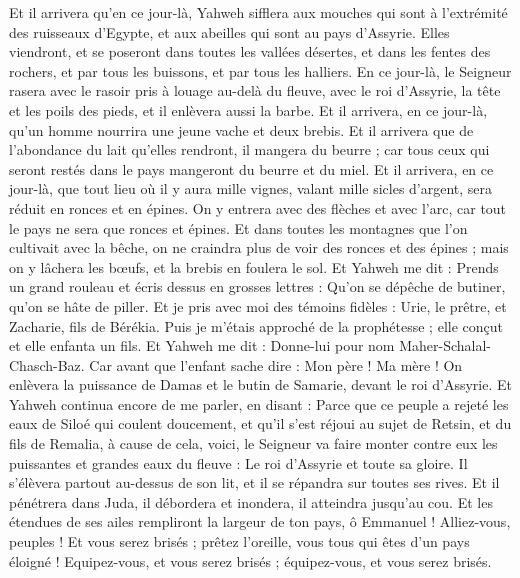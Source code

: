 \begin{multicols}{2}
Et il arrivera qu'en ce jour-là, Yahweh sifflera aux mouches qui sont à l'extrémité des ruisseaux d'Egypte, et aux abeilles qui sont au pays d'Assyrie.
Elles viendront, et se poseront dans toutes les vallées désertes, et dans les fentes des rochers, et par tous les buissons, et par tous les halliers.
En ce jour-là, le Seigneur rasera avec le rasoir pris à louage au-delà du fleuve, avec le roi d'Assyrie, la tête et les poils des pieds, et il enlèvera aussi la barbe.
Et il arrivera, en ce jour-là, qu'un homme nourrira une jeune vache et deux brebis.
Et il arrivera que de l'abondance du lait qu'elles rendront, il mangera du beurre ; car tous ceux qui seront restés dans le pays mangeront du beurre et du miel.
Et il arrivera, en ce jour-là, que tout lieu où il y aura mille vignes, valant mille sicles d'argent, sera réduit en ronces et en épines.
On y entrera avec des flèches et avec l'arc, car tout le pays ne sera que ronces et épines.
Et dans toutes les montagnes que l'on cultivait avec la bêche, on ne craindra plus de voir des ronces et des épines ; mais on y lâchera les bœufs, et la brebis en foulera le sol.
\VerseOne{}Et Yahweh me dit : Prends un grand rouleau et écris dessus en grosses lettres : Qu'on se dépêche de butiner, qu'on se hâte de piller.
Et je pris avec moi des témoins fidèles : Urie, le prêtre, et Zacharie, fils de Bérékia.
Puis je m'étais approché de la prophétesse ; elle conçut et elle enfanta un fils. Et Yahweh me dit : Donne-lui pour nom Maher-Schalal-Chasch-Baz.
Car avant que l'enfant sache dire : Mon père ! Ma mère ! On enlèvera la puissance de Damas et le butin de Samarie, devant le roi d'Assyrie.
Et Yahweh continua encore de me parler, en disant :
Parce que ce peuple a rejeté les eaux de Siloé qui coulent doucement, et qu'il s'est réjoui au sujet de Retsin, et du fils de Remalia,
à cause de cela, voici, le Seigneur va faire monter contre eux les puissantes et grandes eaux du fleuve : Le roi d'Assyrie et toute sa gloire. Il s'élèvera partout au-dessus de son lit, et il se répandra sur toutes ses rives.
Et il pénétrera dans Juda, il débordera et inondera, il atteindra jusqu'au cou. Et les étendues de ses ailes rempliront la largeur de ton pays, ô Emmanuel !
Alliez-vous, peuples ! Et vous serez brisés ; prêtez l'oreille, vous tous qui êtes d'un pays éloigné ! Equipez-vous, et vous serez brisés ; équipez-vous, et vous serez brisés.

\end{multicols}
